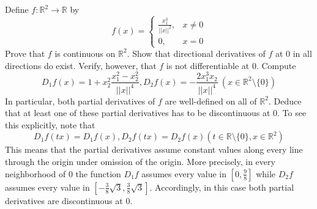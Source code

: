 \newpage

\begin{exercise}{11}
    Define $f: \mathbb{R}^2 \rightarrow \mathbb{R}$ by
    $$f(x) = \begin{cases}
        \frac{x_1^3}{\lvert \lvert x \rvert \rvert^2}, & x \neq 0\\
        0, & x = 0
    \end{cases}$$
    Prove that $f$ is continuous on $\mathbb{R}^2$. 
    Show that directional derivatives of $f$ at 0 in all directions do exist. Verify, however, that $f$ is not differentiable at 0. 
    Compute
    $$D_1 f(x) = 1 + x_2^2\frac{x_1^2 - x_2^2}{\lvert \lvert x \rvert \rvert^4}, D_2 f(x) = -\frac{2x_1^3x_2}{\lvert \lvert x \rvert \rvert^4} \ (x \in \mathbb{R}^2 \setminus \{0\})$$
    In particular, both partial derivatives of $f$ are well-defined on all of $\mathbb{R}^2$. Deduce that at least one of these partial derivatives has to be discontinuous at 0. To see this explicitly, note that
    $$D_1 f(tx) = D_1 f(x), D_2 f(tx) = D_2 f(x) (t \in \mathbb{R} \setminus \{0\}, x \in \mathbb{R}^2)$$
    This means that the partial derivatives assume constant values along every line through the origin under omission of the origin. More precisely, in every neighborhood of 0 the function $D_1 f$ assumes every value in $[0, \frac{9}{8}]$ while $D_2 f$ assumes every value in $[-\frac{3}{8}\sqrt{3}, \frac{3}{8}\sqrt{3}]$. Accordingly, in this case both partial derivatives are discontinuous at 0.
\end{exercise}

